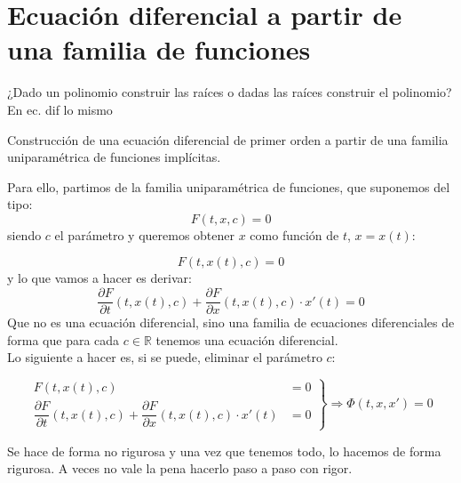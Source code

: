 
\section{Ecuación diferencial a partir de una familia de funciones}
¿Dado un polinomio construir las raíces o dadas las raíces construir el polinomio?
En ec. dif lo mismo

Construcción de una ecuación diferencial de primer orden a partir de una familia uniparamétrica de funciones implícitas.

Para ello, partimos de la familia uniparamétrica de funciones, que suponemos del tipo:
\begin{equation*}
    F(t,x,c) = 0
\end{equation*}
siendo $c$ el parámetro y queremos obtener $x$ como función de $t$, $x=x(t)$:

\begin{equation*}
    F(t,x(t),c) = 0
\end{equation*}
y lo que vamos a hacer es derivar:
\begin{equation*}
    \dfrac{\partial F}{\partial t}(t,x(t),c) + \dfrac{\partial F}{\partial x}(t,x(t),c)\cdot x'(t) = 0
\end{equation*}
Que no es una ecuación diferencial, sino una familia de ecuaciones diferenciales de forma que para cada $c\in \mathbb{R}$ tenemos una ecuación diferencial.\\

Lo siguiente a hacer es, si se puede, eliminar el parámetro $c$:

\begin{equation*}
    \left.\begin{array}{rr}
                F(t,x(t),c) &= 0 \\
                \dfrac{\partial F}{\partial t}(t,x(t),c) + \dfrac{\partial F}{\partial x}(t,x(t),c)\cdot x'(t) &= 0
        \end{array}\right\} \Longrightarrow \Phi(t,x,x') = 0
\end{equation*}

Se hace de forma no rigurosa y una vez que tenemos todo, lo hacemos de forma rigurosa. A veces no vale la pena hacerlo paso a paso con rigor.

